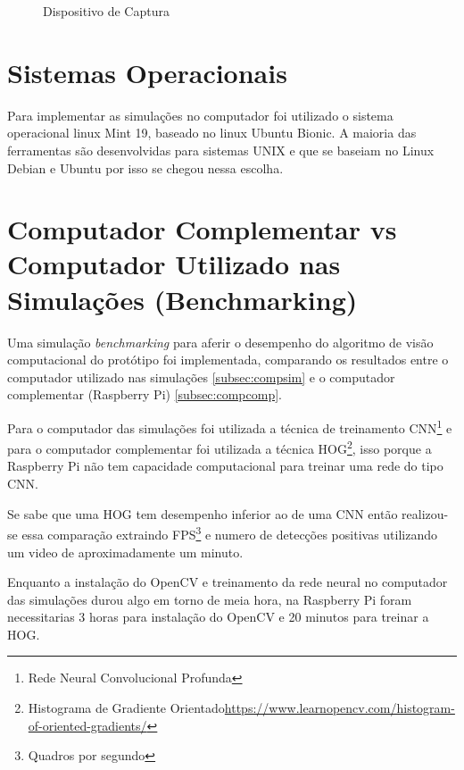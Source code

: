 \begin{figure}[H]
	\centering	
	\caption{Dispositivo de Captura}
	\def\svgwidth{10cm}
	
	\label{fig:cam}
\end{figure}

\section{Sistemas Operacionais}

Para implementar as simulações no computador foi utilizado o sistema operacional linux Mint 19, baseado no linux Ubuntu Bionic.
A maioria das ferramentas são desenvolvidas para sistemas UNIX e que se baseiam no Linux Debian e Ubuntu por isso se chegou nessa escolha.



\section{Computador Complementar vs Computador Utilizado nas Simulações (Benchmarking)}

Uma simulação \textit{benchmarking} para aferir o desempenho do algoritmo de visão computacional do protótipo foi implementada, comparando os resultados entre o computador utilizado nas simulações \ref{subsec:compsim} e o computador complementar (Raspberry Pi) \ref{subsec:compcomp}.

Para o computador das simulações foi utilizada a técnica de treinamento CNN\footnote{Rede Neural Convolucional Profunda} e para o computador complementar foi utilizada a técnica HOG\footnote{Histograma de Gradiente Orientado\url{https://www.learnopencv.com/histogram-of-oriented-gradients/}}, isso porque a Raspberry Pi não tem capacidade computacional para treinar uma rede do tipo CNN.

Se sabe que uma HOG tem desempenho inferior ao de uma CNN então realizou-se essa comparação extraindo FPS\footnote{Quadros por segundo} e numero de detecções positivas utilizando um video de aproximadamente um minuto.    

Enquanto a instalação do OpenCV e treinamento da rede neural no computador das simulações durou algo em torno de meia hora, na Raspberry Pi foram necessitarias 3 horas para instalação do OpenCV e 20 minutos para treinar a HOG.


